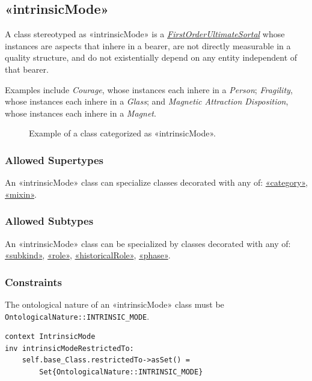 \subsection{«intrinsicMode»}
\label{stereotype:intrinsicMode}

A class stereotyped as «intrinsicMode» is a \hyperref[stereotype:firstOrderUltimateSortal]{\textit{FirstOrderUltimateSortal}} whose instances are aspects that inhere in a bearer, are not directly measurable in a quality structure, and do not existentially depend on any entity independent of that bearer.

Examples include \textit{Courage}, whose instances each inhere in a \textit{Person}; \textit{Fragility}, whose instances each inhere in a \textit{Glass}; and \textit{Magnetic Attraction Disposition}, whose instances each inhere in a \textit{Magnet}.

\begin{figure}[h]
    \centering
    
    \caption{Example of a class categorized as «intrinsicMode».}
    \label{fig:intrinsicMode-example}
\end{figure}

\subsubsection{Allowed Supertypes}

An «intrinsicMode» class can specialize classes decorated with any of:
\hyperref[stereotype:category]{«category»}, \hyperref[stereotype:mixin]{«mixin»}.

\subsubsection{Allowed Subtypes}

An «intrinsicMode» class can be specialized by classes decorated with any of:
\hyperref[stereotype:subkind]{«subkind»}, \hyperref[stereotype:role]{«role»}, \hyperref[stereotype:historicalRole]{«historicalRole»}, \hyperref[stereotype:phase]{«phase»}.

\subsubsection{Constraints}

\begin{constraint}
\label{intrinsicModeRestrictedTo}
The ontological nature of an «intrinsicMode» class must be \texttt{OntologicalNature::INTRINSIC\_MODE}.

\begin{lstlisting}[language=OCL]
context IntrinsicMode
inv intrinsicModeRestrictedTo:
    self.base_Class.restrictedTo->asSet() =
        Set{OntologicalNature::INTRINSIC_MODE}
\end{lstlisting}
\end{constraint}

